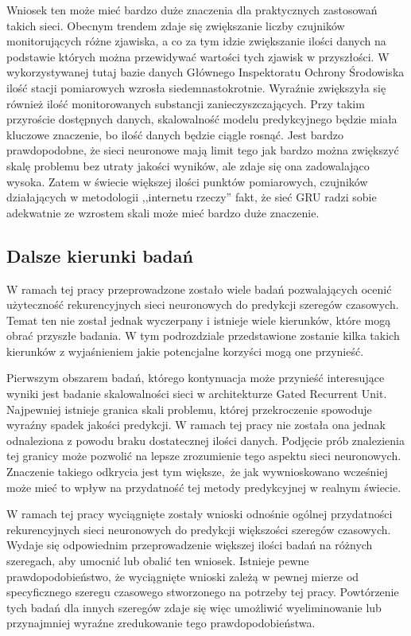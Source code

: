 \documentclass[10pt,a4paper]{article}
\begin{document}
Wniosek ten może mieć bardzo duże znaczenia dla praktycznych zastosowań takich sieci. Obecnym trendem zdaje się zwiększanie liczby czujników monitorujących różne zjawiska, a co za tym idzie zwiększanie ilości danych na podstawie których można przewidywać wartości tych zjawisk w przyszłości. W wykorzystywanej tutaj bazie danych Głównego Inspektoratu Ochrony Środowiska ilość stacji pomiarowych wzrosła siedemnastokrotnie. Wyraźnie zwiększyła się również ilość monitorowanych substancji zanieczyszczających. Przy takim przyroście dostępnych danych, skalowalność modelu predykcyjnego będzie miała kluczowe znaczenie, bo ilość danych będzie ciągle rosnąć. Jest bardzo prawdopodobne, że sieci neuronowe mają limit tego jak bardzo można zwiększyć skalę problemu bez utraty jakości wyników, ale zdaje się ona zadowalająco wysoka. Zatem w świecie większej ilości punktów pomiarowych, czujników działających w metodologii ,,internetu rzeczy'' fakt, że sieć GRU radzi sobie adekwatnie ze wzrostem skali może mieć bardzo duże znaczenie.

\subsection{Dalsze kierunki badań}
W ramach tej pracy przeprowadzone zostało wiele badań pozwalających ocenić użyteczność rekurencyjnych sieci neuronowych do predykcji szeregów czasowych. Temat ten nie został jednak wyczerpany i istnieje wiele kierunków, które mogą obrać przyszłe badania. W tym podrozdziale przedstawione zostanie kilka takich kierunków z wyjaśnieniem jakie potencjalne korzyści mogą one przynieść. 

Pierwszym obszarem badań, którego kontynuacja może przynieść interesujące wyniki jest badanie skalowalności sieci w architekturze Gated Recurrent Unit. Najpewniej istnieje granica skali problemu, której przekroczenie spowoduje wyraźny spadek jakości predykcji. W ramach tej pracy nie została ona jednak odnaleziona z powodu braku dostatecznej ilości danych. Podjęcie prób znalezienia tej granicy może pozwolić na lepsze zrozumienie tego aspektu sieci neuronowych. Znaczenie takiego odkrycia jest tym większe, że jak wywnioskowano wcześniej może mieć to wpływ na przydatność tej metody predykcyjnej w realnym świecie. 

W ramach tej pracy wyciągnięte zostały wnioski odnośnie ogólnej przydatności rekurencyjnych sieci neuronowych do predykcji większości szeregów czasowych. Wydaje się odpowiednim przeprowadzenie większej ilości badań na różnych szeregach, aby umocnić lub obalić ten wniosek. Istnieje pewne prawdopodobieństwo, że wyciągnięte wnioski zależą w pewnej mierze od specyficznego szeregu czasowego stworzonego na potrzeby tej pracy. Powtórzenie tych badań dla innych szeregów zdaje się więc umożliwić wyeliminowanie lub przynajmniej wyraźne zredukowanie tego prawdopodobieństwa. 
\end{document}
